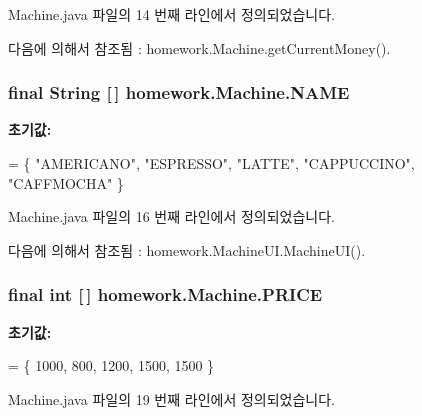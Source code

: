 Machine.\+java 파일의 14 번째 라인에서 정의되었습니다.



다음에 의해서 참조됨 \+:  homework.\+Machine.\+get\+Current\+Money().

\subsubsection[{\texorpdfstring{N\+A\+ME}{NAME}}]{\setlength{\rightskip}{0pt plus 5cm}final String \mbox{[}$\,$\mbox{]} homework.\+Machine.\+N\+A\+ME\hspace{0.3cm}{\ttfamily [static]}}\hypertarget{classhomework_1_1_machine_acc0990993af94d5daf7927b4553256f4}{}\label{classhomework_1_1_machine_acc0990993af94d5daf7927b4553256f4}
{\bfseries 초기값\+:}
\begin{DoxyCode}
= \{
            \textcolor{stringliteral}{"AMERICANO"}, \textcolor{stringliteral}{"ESPRESSO"}, \textcolor{stringliteral}{"LATTE"}, \textcolor{stringliteral}{"CAPPUCCINO"}, \textcolor{stringliteral}{"CAFFMOCHA"}
            \}
\end{DoxyCode}


Machine.\+java 파일의 16 번째 라인에서 정의되었습니다.



다음에 의해서 참조됨 \+:  homework.\+Machine\+U\+I.\+Machine\+U\+I().

\subsubsection[{\texorpdfstring{P\+R\+I\+CE}{PRICE}}]{\setlength{\rightskip}{0pt plus 5cm}final int \mbox{[}$\,$\mbox{]} homework.\+Machine.\+P\+R\+I\+CE\hspace{0.3cm}{\ttfamily [static]}}\hypertarget{classhomework_1_1_machine_a7b0f75289547dfd0aa81f1d842d9c7e4}{}\label{classhomework_1_1_machine_a7b0f75289547dfd0aa81f1d842d9c7e4}
{\bfseries 초기값\+:}
\begin{DoxyCode}
= \{ 
            1000, 800, 1200, 1500, 1500
            \}
\end{DoxyCode}


Machine.\+java 파일의 19 번째 라인에서 정의되었습니다.



